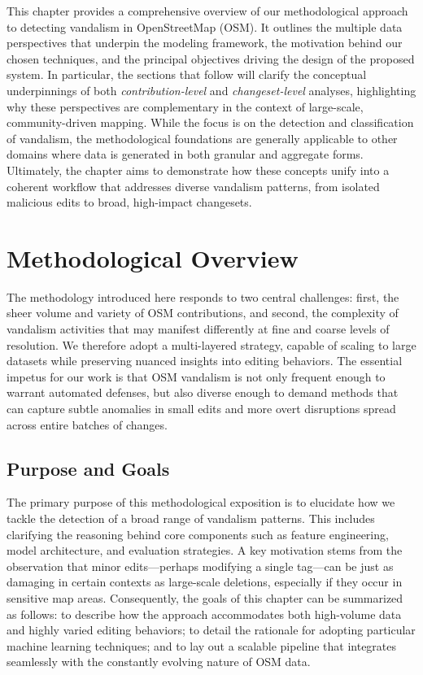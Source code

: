 \documentclass[
    13pt, %
    a4paper, %
    twoside, 
    DIV14, %
    listof=totoc, %
    bibliography=totoc, %
    index=totoc, %
    headsepline
]{scrreprt}
\begin{document}
\noindent
This chapter provides a comprehensive overview of our methodological approach to detecting vandalism in OpenStreetMap (OSM). It outlines the multiple data perspectives that underpin the modeling framework, the motivation behind our chosen techniques, and the principal objectives driving the design of the proposed system. In particular, the sections that follow will clarify the conceptual underpinnings of both \emph{contribution-level} and \emph{changeset-level} analyses, highlighting why these perspectives are complementary in the context of large-scale, community-driven mapping. While the focus is on the detection and classification of vandalism, the methodological foundations are generally applicable to other domains where data is generated in both granular and aggregate forms. Ultimately, the chapter aims to demonstrate how these concepts unify into a coherent workflow that addresses diverse vandalism patterns, from isolated malicious edits to broad, high-impact changesets.

\section{Methodological Overview}
\label{sec:methodological_overview}

\noindent
The methodology introduced here responds to two central challenges: first, the sheer volume and variety of OSM contributions, and second, the complexity of vandalism activities that may manifest differently at fine and coarse levels of resolution. We therefore adopt a multi-layered strategy, capable of scaling to large datasets while preserving nuanced insights into editing behaviors. The essential impetus for our work is that OSM vandalism is not only frequent enough to warrant automated defenses, but also diverse enough to demand methods that can capture subtle anomalies in small edits and more overt disruptions spread across entire batches of changes.

\vspace{1em}
\subsection{Purpose and Goals}
\label{sec:purpose_and_goals}

\noindent
The primary purpose of this methodological exposition is to elucidate how we tackle the detection of a broad range of vandalism patterns. This includes clarifying the reasoning behind core components such as feature engineering, model architecture, and evaluation strategies. A key motivation stems from the observation that minor edits—perhaps modifying a single tag—can be just as damaging in certain contexts as large-scale deletions, especially if they occur in sensitive map areas. Consequently, the goals of this chapter can be summarized as follows: to describe how the approach accommodates both high-volume data and highly varied editing behaviors; to detail the rationale for adopting particular machine learning techniques; and to lay out a scalable pipeline that integrates seamlessly with the constantly evolving nature of OSM data.
\end{document}
